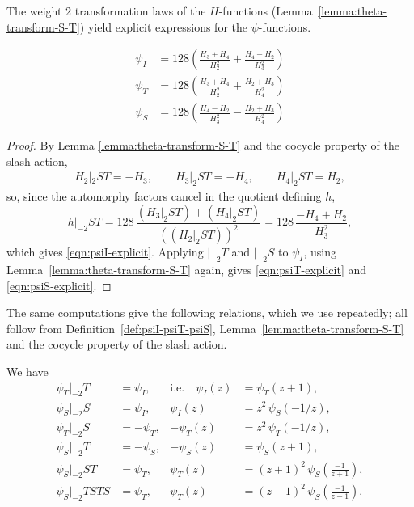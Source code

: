 The weight $2$ transformation laws of the $H$-functions (Lemma~\ref{lemma:theta-transform-S-T}) yield explicit expressions for the $\psi$-functions.

\begin{lemma}\label{lemma:psi-explicit}\leanok
\begin{align}
    \psi_I &= 128 \left(\frac{H_3 + H_4}{H_2^2} + \frac{H_4 - H_2}{H_3^2}\right) \label{eqn:psiI-explicit}\\
    \psi_T &= 128 \left(\frac{H_3 + H_4}{H_2^2} + \frac{H_2 + H_3}{H_4^2}\right) \label{eqn:psiT-explicit}\\
    \psi_S &= 128 \left(\frac{H_4 - H_2}{H_3^2} - \frac{H_2 + H_3}{H_4^2}\right) \label{eqn:psiS-explicit}
\end{align}
\end{lemma}
\begin{proof}\leanok
By Lemma \ref{lemma:theta-transform-S-T} and the cocycle property of the slash action,
\begin{align}
    H_2|_{2}ST = -H_3, \qquad
    H_3|_{2}ST = -H_4, \qquad
    H_4|_{2}ST = H_2,
\end{align}
so, since the automorphy factors cancel in the quotient defining $h$,
\[
    h|_{-2}ST = 128\,\frac{(H_3|_2 ST) + (H_4|_2 ST)}{((H_2|_2 ST))^2}
    = 128\, \frac{-H_4 + H_2}{H_3^2},
\]
which gives \eqref{eqn:psiI-explicit}. Applying $|_{-2}T$ and $|_{-2}S$ to $\psi_I$, using Lemma~\ref{lemma:theta-transform-S-T} again, gives \eqref{eqn:psiT-explicit} and \eqref{eqn:psiS-explicit}.
\end{proof}

The same computations give the following relations, which we use repeatedly; all follow from Definition~\ref{def:psiI-psiT-psiS}, Lemma~\ref{lemma:theta-transform-S-T} and the cocycle property of the slash action.

\begin{lemma}\label{lemma:psi-slash-relations}\leanok
We have
\begin{align}
    \psi_T|_{-2}T &= \psi_I, & \text{i.e.}\quad \psi_I(z) &= \psi_T(z+1), \label{eqn:psi-rel-TT}\\
    \psi_S|_{-2}S &= \psi_I, & \psi_I(z) &= z^2\,\psi_S(-1/z), \label{eqn:psi-rel-SS}\\
    \psi_T|_{-2}S &= -\psi_T, & -\psi_T(z) &= z^2\,\psi_T(-1/z), \label{eqn:psi-rel-TS}\\
    \psi_S|_{-2}T &= -\psi_S, & -\psi_S(z) &= \psi_S(z+1), \label{eqn:psi-rel-ST}\\
    \psi_S|_{-2}ST &= \psi_T, & \psi_T(z) &= (z+1)^2\,\psi_S\!\left(\frac{-1}{z+1}\right), \label{eqn:psi-rel-SST}\\
    \psi_S|_{-2}TSTS &= \psi_T, & \psi_T(z) &= (z-1)^2\,\psi_S\!\left(\frac{-1}{z-1}\right). \label{eqn:psi-rel-STSTS}
\end{align}
\end{lemma}

